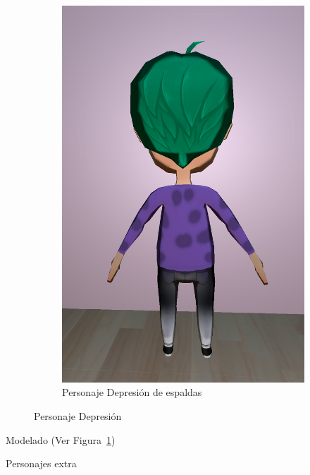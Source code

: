 \documentclass[12pt, a4paper,twoside,titlepage]{book}
\begin{document}
\begin{figure}
\begin{subfigure}{.5\textwidth}
  \includegraphics[width=.95\linewidth]{TGF/Artes/DEP_back.png}
  \caption{Personaje Depresión de espaldas}
\end{subfigure}
\caption{Personaje Depresión}
\label{fig:ArtesDEP2}
\end{figure}

 Modelado (Ver Figura~\ref{fig:ArtesDEP2})
 

Personajes extra
 
\end{document}
